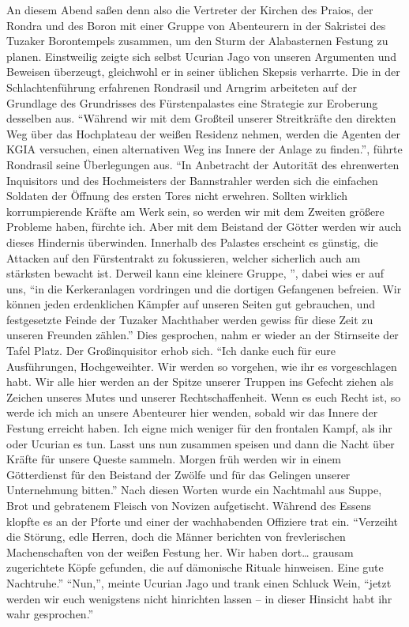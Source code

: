 An diesem Abend saßen denn also die Vertreter der Kirchen des Praios, der Rondra und des Boron mit einer Gruppe von Abenteurern in der Sakristei des Tuzaker Borontempels zusammen, um den Sturm der Alabasternen Festung zu planen. Einstweilig zeigte sich selbst Ucurian Jago von unseren Argumenten und Beweisen überzeugt, gleichwohl er in seiner üblichen Skepsis verharrte. Die in der Schlachtenführung erfahrenen Rondrasil und Arngrim arbeiteten auf der Grundlage des Grundrisses des Fürstenpalastes eine Strategie zur Eroberung desselben aus. ``Während wir mit dem Großteil unserer Streitkräfte den direkten Weg über das Hochplateau der weißen Residenz nehmen, werden die Agenten der KGIA versuchen, einen alternativen Weg ins Innere der Anlage zu finden.'', führte Rondrasil seine Überlegungen aus. ``In Anbetracht der Autorität des ehrenwerten Inquisitors und des Hochmeisters der Bannstrahler werden sich die einfachen Soldaten der Öffnung des ersten Tores nicht erwehren. Sollten wirklich korrumpierende Kräfte am Werk sein, so werden wir mit dem Zweiten größere Probleme haben, fürchte ich. Aber mit dem Beistand der Götter werden wir auch dieses Hindernis überwinden. Innerhalb des Palastes erscheint es günstig, die Attacken auf den Fürstentrakt zu fokussieren, welcher sicherlich auch am stärksten bewacht ist. Derweil kann eine kleinere Gruppe, '', dabei wies er auf uns, ``in die Kerkeranlagen vordringen und die dortigen Gefangenen befreien. Wir können jeden erdenklichen Kämpfer auf unseren Seiten gut gebrauchen, und festgesetzte Feinde der Tuzaker Machthaber werden gewiss für diese Zeit zu unseren Freunden zählen.'' Dies gesprochen, nahm er wieder an der Stirnseite der Tafel Platz. Der Großinquisitor erhob sich. ``Ich danke euch für eure Ausführungen, Hochgeweihter. Wir werden so vorgehen, wie ihr es vorgeschlagen habt. Wir alle hier werden an der Spitze unserer Truppen ins Gefecht ziehen als Zeichen unseres Mutes und unserer Rechtschaffenheit. Wenn es euch Recht ist, so werde ich mich an unsere Abenteurer hier wenden, sobald wir das Innere der Festung erreicht haben. Ich eigne mich weniger für den frontalen Kampf, als ihr oder Ucurian es tun. Lasst uns nun zusammen speisen und dann die Nacht über Kräfte für unsere Queste sammeln. Morgen früh werden wir in einem Götterdienst für den Beistand der Zwölfe und für das Gelingen unserer Unternehmung bitten.'' Nach diesen Worten wurde ein Nachtmahl aus Suppe, Brot und gebratenem Fleisch von Novizen aufgetischt. Während des Essens klopfte es an der Pforte und einer der wachhabenden Offiziere trat ein. ``Verzeiht die Störung, edle Herren, doch die Männer berichten von frevlerischen Machenschaften von der weißen Festung her. Wir haben dort… grausam zugerichtete Köpfe gefunden, die auf dämonische Rituale hinweisen. Eine gute Nachtruhe.'' ``Nun,'', meinte Ucurian Jago und trank einen Schluck Wein, ``jetzt werden wir euch wenigstens nicht hinrichten lassen -- in dieser Hinsicht habt ihr wahr gesprochen.''



